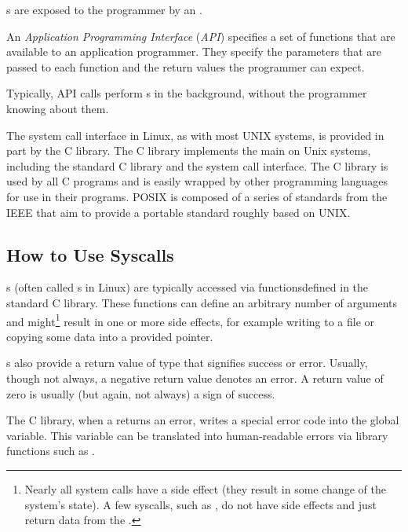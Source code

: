 s are exposed to the programmer by an .
\begin{definition}\label{def:API}
  An \emph{Application Programming Interface} (\emph{API}) specifies a set of functions that are available to an application programmer.
  They specify the parameters that are passed to each function and the return values the programmer can expect.

  Typically, API calls perform s in the background, without the programmer knowing about them.
\end{definition}

The system call interface in Linux, as with most UNIX systems, is provided in part by the C library.
The C library implements the main  on Unix systems, including the standard C library and the system call interface.
The C library is used by all C programs and is easily wrapped by other programming languages for use in their programs.
POSIX is composed of a series of standards from the IEEE that aim to provide a portable  standard roughly based on UNIX.\@

\subsection{How to Use Syscalls}\label{subsec:How_To_Use_Syscalls}
s (often called s in Linux) are typically accessed via functionsdefined in the standard C library.
These functions can define an arbitrary number of arguments and might\footnote{Nearly all system calls have a side effect (they result in some change of the system’s state). A few syscalls, such as , do not have side effects and just return data from the .} result in one or more side effects, for example writing to a file or copying some data into a provided pointer.

s also provide a return value of type  that signifies success or error.
Usually, though not always, a negative return value denotes an error.
A return value of zero is usually (but again, not always) a sign of success.

The C library, when a  returns an error, writes a special error code into the global  variable.
This variable can be translated into human-readable errors via library functions such as .

